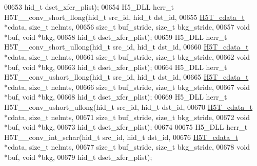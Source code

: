 \begin{DoxyCode}
00653                                      hid\_t dset\_xfer\_plist);
00654 H5\_DLL herr\_t H5T\_\_conv\_short\_llong(hid\_t src\_id, hid\_t dst\_id,
00655                     \hyperlink{struct_h5_t__cdata__t}{H5T\_cdata\_t} *cdata, \textcolor{keywordtype}{size\_t} nelmts,
00656                     \textcolor{keywordtype}{size\_t} buf\_stride, \textcolor{keywordtype}{size\_t} bkg\_stride,
00657                                     \textcolor{keywordtype}{void} *buf, \textcolor{keywordtype}{void} *bkg,
00658                                     hid\_t dset\_xfer\_plist);
00659 H5\_DLL herr\_t H5T\_\_conv\_short\_ullong(hid\_t src\_id, hid\_t dst\_id,
00660                      \hyperlink{struct_h5_t__cdata__t}{H5T\_cdata\_t} *cdata, \textcolor{keywordtype}{size\_t} nelmts,
00661                      \textcolor{keywordtype}{size\_t} buf\_stride, \textcolor{keywordtype}{size\_t} bkg\_stride,
00662                                      \textcolor{keywordtype}{void} *buf, \textcolor{keywordtype}{void} *bkg,
00663                                      hid\_t dset\_xfer\_plist);
00664 H5\_DLL herr\_t H5T\_\_conv\_ushort\_llong(hid\_t src\_id, hid\_t dst\_id,
00665                      \hyperlink{struct_h5_t__cdata__t}{H5T\_cdata\_t} *cdata, \textcolor{keywordtype}{size\_t} nelmts,
00666                      \textcolor{keywordtype}{size\_t} buf\_stride, \textcolor{keywordtype}{size\_t} bkg\_stride,
00667                                      \textcolor{keywordtype}{void} *buf, \textcolor{keywordtype}{void} *bkg,
00668                                      hid\_t dset\_xfer\_plist);
00669 H5\_DLL herr\_t H5T\_\_conv\_ushort\_ullong(hid\_t src\_id, hid\_t dst\_id,
00670                       \hyperlink{struct_h5_t__cdata__t}{H5T\_cdata\_t} *cdata, \textcolor{keywordtype}{size\_t} nelmts,
00671                       \textcolor{keywordtype}{size\_t} buf\_stride, \textcolor{keywordtype}{size\_t} bkg\_stride,
00672                                       \textcolor{keywordtype}{void} *buf, \textcolor{keywordtype}{void} *bkg,
00673                                       hid\_t dset\_xfer\_plist);
00674 
00675 H5\_DLL herr\_t H5T\_\_conv\_int\_schar(hid\_t src\_id, hid\_t dst\_id,
00676                   \hyperlink{struct_h5_t__cdata__t}{H5T\_cdata\_t} *cdata, \textcolor{keywordtype}{size\_t} nelmts,
00677                   \textcolor{keywordtype}{size\_t} buf\_stride, \textcolor{keywordtype}{size\_t} bkg\_stride,
00678                                   \textcolor{keywordtype}{void} *buf, \textcolor{keywordtype}{void} *bkg,
00679                                   hid\_t dset\_xfer\_plist);

\end{DoxyCode}
